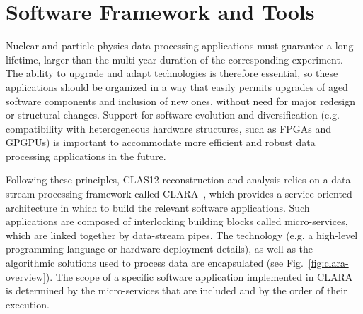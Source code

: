 \section{Software Framework and Tools}
\label{sec:framework}


Nuclear and particle physics data processing applications must guarantee a long lifetime, larger than the multi-year
duration of the corresponding experiment. The ability to upgrade and adapt technologies is therefore essential, so
these applications should be organized in a way that easily permits upgrades of aged software components and
inclusion of new ones, without need for major redesign or structural changes.  Support for software evolution and
diversification (e.g. compatibility with heterogeneous hardware structures, such as FPGAs and GPGPUs) is important
to accommodate more efficient and robust data processing applications in the future.

Following these principles, CLAS12 reconstruction and analysis relies on a data-stream processing framework called
CLARA~\cite{clara-2011,clara-service,framework,clara-2016}, which provides a service-oriented architecture in which
to build the relevant software applications.  Such applications are composed of interlocking building blocks called
micro-services, which are linked together by data-stream pipes.  The technology (e.g. a high-level programming
language or hardware deployment details), as well as the algorithmic solutions used to process data are encapsulated
(see Fig.~\ref{fig:clara-overview}). The scope of a specific software application implemented in CLARA is determined
by the micro-services that are included and by the order of their execution.

